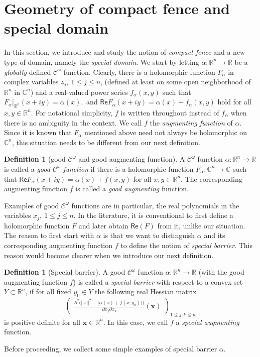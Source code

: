 \documentclass[12pt,reqno, a4paper]{amsart}
\theoremstyle{definition}
\theoremstyle{definition}
\newtheorem{definition}[theorem]{Definition}
\numberwithin{equation}{section}
\def\R{\mathbb{R}}                              %
\def\C{\mathbb{C}}                              %
\begin{document}
\section{Geometry of compact fence and special domain}\label{sec_4}
In this section, we introduce and study the notion of \textit{compact fence} and a new type of domain, namely the \textit{special domain}. We start by letting $\alpha: \R^n\to \R$ be a \textit{globally} defined $\mathcal{C}^{\omega}$ function. Clearly, there is a holomorphic function $F_{\alpha}$ in complex variables $z_j,~ 1\leq j\leq n$, (defined at least on some open neighborhood of $\R^n$ in $\C^n$) and a real-valued power series $f_{\alpha}(x,y)$ such that $F_{\alpha}|_{\R^n}(x+iy)=\alpha(x),$ and  $\textsf{Re}F_{\alpha}(x+iy)=\alpha(x)+f_{\alpha}(x,y)$ hold for all $x,y \in \R^n$. For notational simplicity, $f$ is written throughout instead of $f_{\alpha}$ when there is no ambiguity in the context. We call $f$ the \textit{augmenting function} of $\alpha$. Since it is known that $F_{\alpha}$ mentioned above need not always be holomorphic on $\C^n$, this situation needs to be different from our next definition. 

\begin{definition}[good $\mathcal{C}^{\omega}$ and good augmenting function]\label{good_alpha}
A $\mathcal{C}^{\omega}$ function $\alpha:\R^n \to \R$ is called a \textit{good $\mathcal{C}^{\omega}$ function} if there is a holomorphic function ${F_{\alpha}:\C^n \to \C}$ such that $\textsf{Re}F_{\alpha}(x+iy)=\alpha(x)+f(x,y)$ for all $x,y \in \R^n$. The corresponding augmenting function $f$ is called a \textit{good augmenting} function.
\end{definition}
Examples of good $\mathcal{C}^{\omega}$ functions are in particular, the real polynomials in the variables $x_j, ~1\leq j\leq n$. In the literature, it is conventional to first define a holomorphic function $F$ and later obtain $\textsf{Re}(F)$ from it, unlike our situation. The reason to first start with $\alpha$ 
is that we want to distinguish $\alpha $ and its corresponding augmenting function $f$ to define the notion of \textit{special barrier}. This reason would become clearer when we introduce our next definition.
\begin{definition}[Special barrier]\label{special_barrier}
A good $\mathcal{C}^{\omega}$ function ${\alpha: \R^n\to \R}$ (with the good augmenting function $f$) is called a \textit{special barrier} with respect to a convex set $Y\subset \R^n$, if for all fixed $y_0\in Y$ the following real Hessian matrix
\begin{equation}\label{matrix_cond}
\begin{pmatrix}
\frac{\partial^2\Big(||x||^2-\big(\alpha(x)+f(x,y_0)\big)\Big)}{\partial x_j\partial x_k}(\textbf{x})
\end{pmatrix}_{1\leq j,k \leq n}\end{equation}
is positive definite for all $\textbf{x}\in \R^n.$ In this case, we call $f$ a \textit{special augmenting} function.

\end{definition}
Before proceeding, we collect some simple examples of special barrier $\alpha$.
\end{document}
